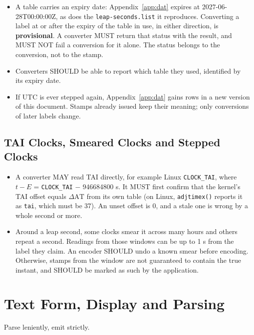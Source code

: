 \documentclass[11pt]{article}
\newcommand{\lit}[1]{\texttt{#1}}
\newcommand{\dAT}{\ensuremath{\Delta\mathrm{AT}}}
\newcommand{\App}[1]{Appendix~\ref{#1}}
\begin{document}
\begin{itemize}
\item A table carries an expiry date: \App{app:dat} expires at
2027-06-28T00:00:00Z, as does the \lit{leap-seconds.list} it reproduces.
Converting a label at or after the expiry of the table in use, in either
direction, is \textbf{provisional}. A converter MUST return that status with
the result, and MUST NOT fail a conversion for it alone. The status belongs to
the conversion, not to the stamp.
\item Converters SHOULD be able to report which table they used, identified by
its expiry date.
\item If UTC is ever stepped again, \App{app:dat} gains rows in a new version
of this document. Stamps already issued keep their meaning; only conversions
of later labels change.
\end{itemize}

\subsection{TAI Clocks, Smeared Clocks and Stepped Clocks}

\begin{itemize}
\item A converter MAY read TAI directly, for example Linux \lit{CLOCK\_TAI},
where $t - E$ = \lit{CLOCK\_TAI} $-$ 946684800 s. It MUST first confirm that
the kernel's TAI offset equals \dAT{} from its own table (on Linux,
\lit{adjtimex()} reports it as \lit{tai}, which must be 37). An unset offset
is 0, and a stale one is wrong by a whole second or more.
\item Around a leap second, some clocks smear it across many hours and others
repeat a second. Readings from those windows can be up to 1 s from the label
they claim. An encoder SHOULD undo a known smear before encoding. Otherwise,
stamps from the window are not guaranteed to contain the true instant, and
SHOULD be marked as such by the application.
\end{itemize}

\section{Text Form, Display and Parsing}\label{sec:text}

Parse leniently, emit strictly.
\end{document}
